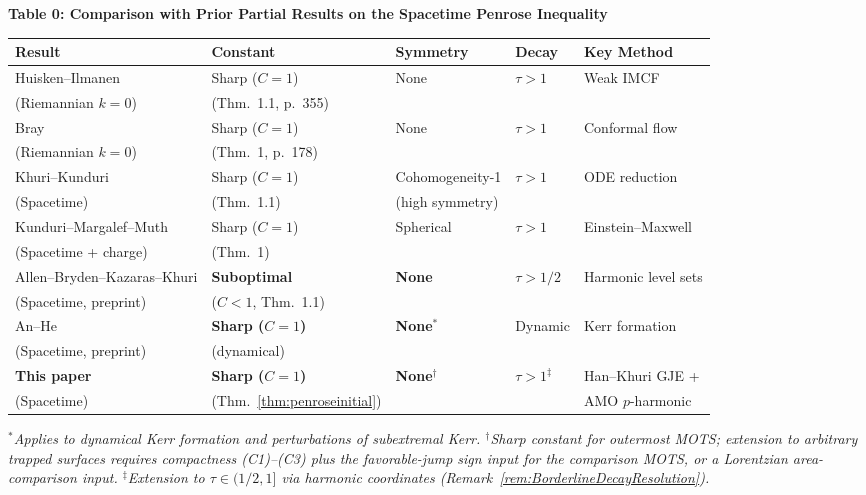 \begin{center}
\textbf{Table 0: Comparison with Prior Partial Results on the Spacetime Penrose Inequality}
\smallskip

\renewcommand{\arraystretch}{1.3}
\begin{tabular}{p{3.2cm}p{2.2cm}p{2.2cm}p{2cm}p{3cm}}
\toprule
\textbf{Result} & \textbf{Constant} & \textbf{Symmetry} & \textbf{Decay} & \textbf{Key Method} \\
\midrule
Huisken--Ilmanen \cite{huisken2001} & Sharp ($C=1$) & None & $\tau > 1$ & Weak IMCF \\
(Riemannian $k=0$) & (Thm.~1.1, p.~355) & & & \\
\midrule
Bray \cite{bray2001} & Sharp ($C=1$) & None & $\tau > 1$ & Conformal flow \\
(Riemannian $k=0$) & (Thm.~1, p.~178) & & & \\
\midrule
Khuri--Kunduri \cite{khurikunduri2024} & Sharp ($C=1$) & Cohomogeneity-1 & $\tau > 1$ & ODE reduction \\
(Spacetime) & (Thm.~1.1) & (high symmetry) & & \\
\midrule
Kunduri--Margalef--Muth \cite{kundurimargalefmuth2023} & Sharp ($C=1$) & Spherical & $\tau > 1$ & Einstein--Maxwell \\
(Spacetime + charge) & (Thm.~1) & & & \\
\midrule
Allen--Bryden--Kazaras--Khuri \cite{allenbrydenkazaraskhuri2025} & \textbf{Suboptimal} & \textbf{None} & $\tau > 1/2$ & Harmonic level sets \\
(Spacetime, preprint) & ($C < 1$, Thm.~1.1) & & & \\
\midrule
An--He \cite{anhe2025} & \textbf{Sharp ($C=1$)} & \textbf{None}$^*$ & Dynamic & Kerr formation \\
(Spacetime, preprint) & (dynamical) & & & \\
\midrule
\textbf{This paper} & \textbf{Sharp ($C=1$)} & \textbf{None}$^\dagger$ & $\tau > 1^\ddagger$ & Han--Khuri GJE + \\
(Spacetime) & (Thm.~\ref{thm:penroseinitial}) & & & AMO $p$-harmonic \\
\bottomrule
\end{tabular}
\end{center}

\noindent\textit{$^*$Applies to dynamical Kerr formation and perturbations of subextremal Kerr. $^\dagger$Sharp constant for outermost MOTS; extension to arbitrary trapped surfaces requires compactness (C1)--(C3) plus the favorable-jump sign input for the comparison MOTS, or a Lorentzian area-comparison input. $^\ddagger$Extension to $\tau \in (1/2, 1]$ via harmonic coordinates (Remark~\ref{rem:BorderlineDecayResolution}).}

